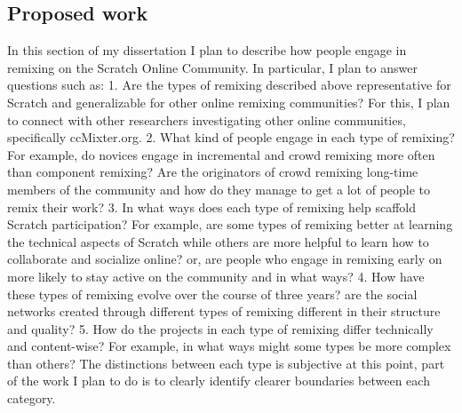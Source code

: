 \subsection{Proposed work}
In this section of my dissertation I plan to describe how people engage in remixing on the Scratch Online Community. 
In particular, I plan to answer questions such as:
1. Are the types of remixing described above representative for Scratch and generalizable for other online remixing communities? 
For this, I plan to connect with other researchers investigating other online communities, specifically ccMixter.org.
2. What kind of people engage in each type of remixing? For example, do novices engage in incremental and crowd remixing more often than component remixing? Are the originators of crowd remixing long-time members of the community and how do they manage to get a lot of people to remix their work?
3. In what ways does each type of remixing help scaffold Scratch participation? For example, are some types of remixing better at learning the technical aspects of Scratch while others are more helpful to learn how to collaborate and socialize online? or, are people who engage in remixing early on more likely to stay active on the community and in what ways?
4. How have these types of remixing evolve over the course of three years?
are the social networks created through different types of remixing different in their structure and quality?
5. How do the projects in each type of remixing differ technically and content-wise? For example, in what ways might some types be more complex than others?
The distinctions between each type is subjective at this point, part of the work I plan to do is to clearly identify clearer boundaries between each category.

